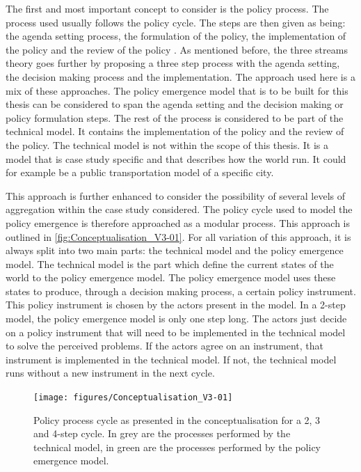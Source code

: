 The first and most important concept to consider is the policy process. The process used usually follows the policy cycle. The steps are then given as being: the agenda setting process, the formulation of the policy, the implementation of the policy and the review of the policy \cite{lester2000public, stewart2007public, palumbo1987symposium, hogwood1984policy, hill2016public}. As mentioned before, the three streams theory goes further by proposing a three step process with the agenda setting, the decision making process and the implementation. The approach used here is a mix of these approaches. The policy emergence model that is to be built for this thesis can be considered to span the agenda setting and the decision making or policy formulation steps. The rest of the process is considered to be part of the technical model. It contains the implementation of the policy and the review of the policy. The technical model is not within the scope of this thesis. It is a model that is case study specific and that describes how the world run. It could for example be a public transportation model of a specific city.

This approach is further enhanced to consider the possibility of several levels of aggregation within the case study considered. The policy cycle used to model the policy emergence is therefore approached as a modular process. This approach is outlined in \autoref{fig:Conceptualisation_V3-01}. For all variation of this approach, it is always split into two main parts: the technical model and the policy emergence model. The technical model is the part which define the current states of the world to the policy emergence model. The policy emergence model uses these states to produce, through a decision making process, a certain policy instrument. This policy instrument is chosen by the actors present in the model. In a 2-step model, the policy emergence model is only one step long. The actors just decide on a policy instrument that will need to be implemented in the technical model to solve the perceived problems. If the actors agree on an instrument, that instrument is implemented in the technical model. If not, the technical model runs without a new instrument in the next cycle.

\begin{figure}
\centering
\texttt{[image: figures/Conceptualisation\_V3-01]}
\caption{Policy process cycle as presented in the conceptualisation for a 2, 3 and 4-step cycle. In grey are the processes performed by the technical model, in green are the processes performed by the policy emergence model. }
\label{fig:Conceptualisation_V3-01}
\end{figure}

